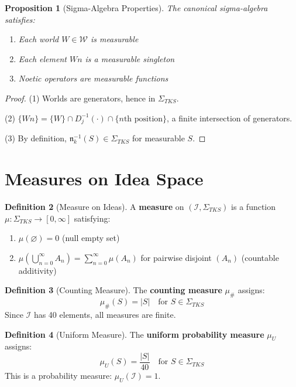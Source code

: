 \documentclass[11pt,twoside,openright]{book}
\theoremstyle{definition}
\newtheorem{definition}{Definition}[chapter]
\theoremstyle{plain}
\newtheorem{proposition}[definition]{Proposition}
\theoremstyle{remark}
\newcommand{\Worlds}{\mathcal{W}}
\newcommand{\Ideas}{\mathcal{I}}
\newcommand{\SigAlg}{\Sigma}                 %
\begin{document}
\begin{proposition}[Sigma-Algebra Properties]
\label{prop:sigma-properties}
The canonical sigma-algebra satisfies:
\begin{enumerate}
  \item Each world $W \in \Worlds$ is measurable
  \item Each element $Wn$ is a measurable singleton
  \item Noetic operators are measurable functions
\end{enumerate}
\end{proposition}

\begin{proof}
(1) Worlds are generators, hence in $\SigAlg_{TKS}$.

(2) $\{Wn\} = \{W\} \cap D_j^{-1}(\cdot) \cap \{n\text{th position}\}$, a finite intersection of generators.

(3) By definition, $\mathfrak{n}_k^{-1}(S) \in \SigAlg_{TKS}$ for measurable $S$.
\end{proof}

\section{Measures on Idea Space}

\begin{definition}[Measure on Ideas]
\label{def:idea-measure}
A \textbf{measure} on $(\Ideas, \SigAlg_{TKS})$ is a function $\mu : \SigAlg_{TKS} \to [0, \infty]$ satisfying:
\begin{enumerate}
  \item $\mu(\varnothing) = 0$ (null empty set)
  \item $\mu\left(\bigcup_{n=0}^\infty A_n\right) = \sum_{n=0}^\infty \mu(A_n)$ for pairwise disjoint $(A_n)$ (countable additivity)
\end{enumerate}
\end{definition}

\begin{definition}[Counting Measure]
\label{def:counting-measure}
The \textbf{counting measure} $\mu_\#$ assigns:
\[
\mu_\#(S) = |S| \quad \text{for } S \in \SigAlg_{TKS}
\]
Since $\Ideas$ has 40 elements, all measures are finite.
\end{definition}

\begin{definition}[Uniform Measure]
\label{def:uniform-measure}
The \textbf{uniform probability measure} $\mu_U$ assigns:
\[
\mu_U(S) = \frac{|S|}{40} \quad \text{for } S \in \SigAlg_{TKS}
\]
This is a probability measure: $\mu_U(\Ideas) = 1$.
\end{definition}
\end{document}
